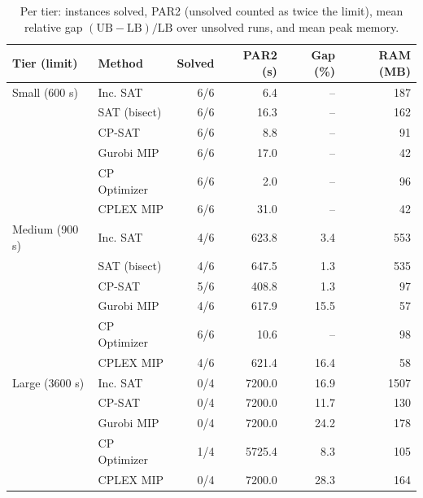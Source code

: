 \begin{table}[t]
\centering
\small
\begin{tabular}{llrrrr}
\toprule
Tier (limit) & Method & Solved & PAR2 (s) & Gap (\%) & RAM (MB) \\
\midrule
Small (600 s) & Inc. SAT & 6/6 & 6.4 & -- & 187 \\
 & SAT (bisect) & 6/6 & 16.3 & -- & 162 \\
 & CP-SAT & 6/6 & 8.8 & -- & 91 \\
 & Gurobi MIP & 6/6 & 17.0 & -- & 42 \\
 & CP Optimizer & 6/6 & 2.0 & -- & 96 \\
 & CPLEX MIP & 6/6 & 31.0 & -- & 42 \\
\midrule
Medium (900 s) & Inc. SAT & 4/6 & 623.8 & 3.4 & 553 \\
 & SAT (bisect) & 4/6 & 647.5 & 1.3 & 535 \\
 & CP-SAT & 5/6 & 408.8 & 1.3 & 97 \\
 & Gurobi MIP & 4/6 & 617.9 & 15.5 & 57 \\
 & CP Optimizer & 6/6 & 10.6 & -- & 98 \\
 & CPLEX MIP & 4/6 & 621.4 & 16.4 & 58 \\
\midrule
Large (3600 s) & Inc. SAT & 0/4 & 7200.0 & 16.9 & 1507 \\
 & CP-SAT & 0/4 & 7200.0 & 11.7 & 130 \\
 & Gurobi MIP & 0/4 & 7200.0 & 24.2 & 178 \\
 & CP Optimizer & 1/4 & 5725.4 & 8.3 & 105 \\
 & CPLEX MIP & 0/4 & 7200.0 & 28.3 & 164 \\
\bottomrule
\end{tabular}
\caption{Per tier: instances solved, PAR2 (unsolved counted as twice the limit), mean relative gap $(\mathrm{UB}-\mathrm{LB})/\mathrm{LB}$ over unsolved runs, and mean peak memory.}\label{tab:summary}
\end{table}
